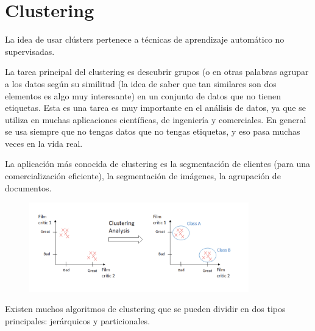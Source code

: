 \documentclass[12pt, fleqn]{report}                             %
\newcommand \Quote              {\qq}                           %
\theoremstyle{break}                                            %
\begin{document}
    \chapter{Clustering}

        La idea de usar clústers pertenece a técnicas de aprendizaje automático no supervisadas.

        La tarea principal del clustering es descubrir grupos \Quote{naturales} (o en otras palabras
        agrupar a los datos según su similitud (la idea de saber que tan similares son dos elementos es algo muy interesante)
        en un conjunto de datos que no tienen
        etiquetas. Esta es una tarea es muy importante en el análisis de datos, ya que se utiliza en muchas
        aplicaciones científicas, de ingeniería y comerciales. En general se usa siempre que no tengas datos que no tengas
        etiquetas, y eso pasa muchas veces en la vida real.
        
        La aplicación más conocida de clustering es la segmentación de clientes
        (para una comercialización eficiente), la segmentación de imágenes, la agrupación de documentos.

        \begin{figure}[h!]
            \centering
            \includegraphics[width=0.85\textwidth]{clustering}
        \end{figure}
        
        Existen muchos algoritmos de clustering que se pueden dividir en dos tipos principales: 
        jerárquicos y particionales.
\end{document}
